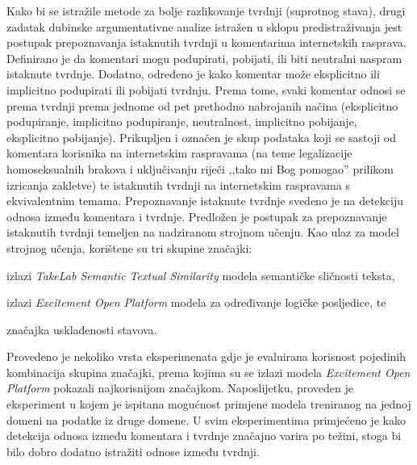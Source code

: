 Kako bi se istražile metode za bolje razlikovanje tvrdnji (suprotnog stava),
drugi zadatak dubinske argumentativne analize istražen u sklopu
predistraživanja jest postupak prepoznavanja istaknutih tvrdnji u komentarima
internetskih rasprava.  Definirano je da komentari mogu podupirati, pobijati,
ili biti neutralni naspram istaknute tvrdnje. Dodatno, određeno je kako
komentar može eksplicitno ili implicitno podupirati ili pobijati tvrdnju. Prema
tome, svaki komentar odnosi se prema tvrdnji prema jednome od pet prethodno
nabrojanih načina (eksplicitno podupiranje, implicitno podupiranje,
neutralnost, implicitno pobijanje, eksplicitno pobijanje).  
Prikupljen i označen je skup podataka \ComArg koji se sastoji od komentara korisnika
na internetskim raspravama (na teme legalizacije homoseksualnih brakova i
uključivanju riječi ,,tako mi Bog pomogao'' prilikom izricanja zakletve) te
istaknutih tvrdnji na internetskim raspravama s ekvivalentnim temama.  Prepoznavanje istaknute
tvrdnje svedeno je na detekciju odnosa između komentara i tvrdnje.  Predložen
je postupak za prepoznavanje istaknutih tvrdnji temeljen na nadziranom strojnom
učenju. Kao ulaz za model strojnog učenja, korištene su tri skupine značajki: 
\begin{enumerate*}
	\item izlazi  \emph{TakeLab Semantic Textual Similarity} 
		modela semantičke sličnosti teksta,
	\item izlazi \emph{Excitement Open Platform} modela za 
		određivanje logičke posljedice, te
	\item značajka usklađenosti stavova.
\end{enumerate*} 
Provedeno je nekoliko vrsta eksperimenata gdje je evaluirana korisnost
pojedinih kombinacija skupina značajki, prema kojima su se izlazi modela
\emph{Excitement Open Platform} pokazali najkorisnijom značajkom.
Naposlijetku, proveden je eksperiment u kojem je ispitana mogućnost primjene
modela treniranog na jednoj domeni na podatke iz druge domene. U svim
eksperimentima primjećeno je kako detekcija odnosa između komentara i tvrdnje
značajno varira po težini, stoga bi bilo dobro dodatno istražiti odnose između
tvrdnji.  

